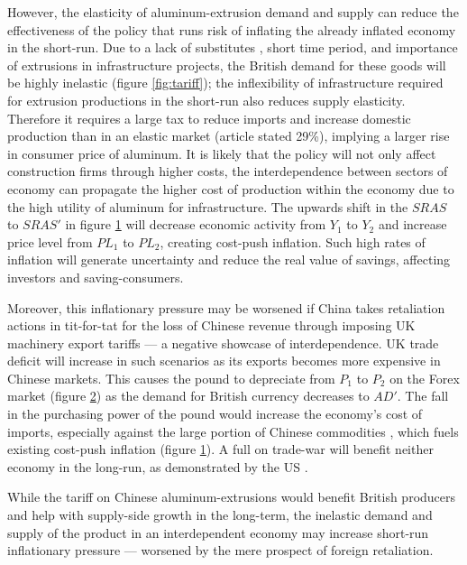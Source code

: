 \documentclass[a4paper,12pt]{article}
\newcommand{\tikzfig}[1]{}
\begin{document}
\begin{figure}[H]
    \centering
    \tikzfig{assets/eco.txt}
    \caption{}
    \label{fig:eco}
\end{figure}
However, the elasticity of aluminum-extrusion demand and supply can reduce the effectiveness of the policy that runs risk of inflating the already inflated economy in the short-run. Due to a lack of substitutes \parencite{statista}, short time period, and importance of extrusions in infrastructure projects, the British demand for these goods will be highly inelastic (figure \ref{fig:tariff}); the inflexibility of infrastructure required for extrusion productions in the short-run also reduces supply elasticity. Therefore it requires a large tax to reduce imports and increase domestic production than in an elastic market (article stated 29\%), implying a larger rise in consumer price of aluminum. It is likely that the policy will not only affect construction firms through higher costs, the interdependence between sectors of economy can propagate the higher cost of production within the economy due to the high utility of aluminum for infrastructure. The upwards shift in the $SRAS$ to $SRAS'$ in figure \ref{fig:eco} will decrease economic activity from $Y_1$ to $Y_2$ and increase price level from $PL_1$ to $PL_2$, creating cost-push inflation. Such high rates of inflation will generate uncertainty and reduce the real value of savings, affecting investors and saving-consumers.



\begin{figure}[H]
    \centering
    \tikzfig{assets/forex.txt}
    \caption{}
    \label{fig:forex}
\end{figure}

Moreover, this inflationary pressure may be worsened if China takes retaliation actions in tit-for-tat for the loss of Chinese revenue through imposing UK machinery export tariffs --- a negative showcase of interdependence. UK trade deficit will increase in such scenarios as its exports becomes more expensive in Chinese markets. This causes the pound to depreciate from $P_1$ to $P_2$ on the Forex market (figure \ref{fig:forex}) as the demand for British currency decreases to $AD'$. The fall in the purchasing power of the pound would increase the economy's cost of imports, especially against the large portion of Chinese commodities \parencite{worldbank_2019}, which fuels existing cost-push inflation (figure \ref{fig:eco}). A full on trade-war will benefit neither economy in the long-run, as demonstrated by the US \parencite{hass_denmark_2022}.

While the tariff on Chinese aluminum-extrusions would benefit British producers and help with supply-side growth in the long-term, the inelastic demand and supply of the product in an interdependent economy may increase short-run inflationary pressure --- worsened by the mere prospect of foreign retaliation.


\newpage
\printbibliography
\end{document}
